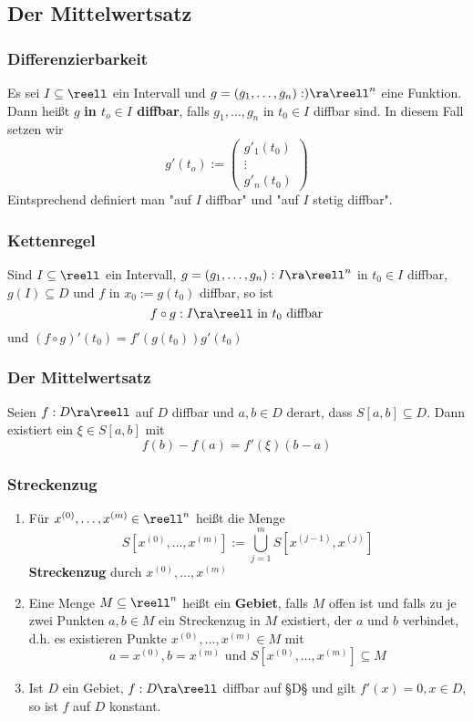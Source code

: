 \documentclass{kit}
\begin{document}
  \subsection{Der Mittelwertsatz}
    \subsubsection{Differenzierbarkeit}
      Es sei $I\subseteq\reell$ ein Intervall und $g=(g_1,\dots,g_n):)\ra\reell^n$ eine Funktion. Dann heißt $g$
      \textbf{in $t_o\in I$ diffbar}, falls $g_1,\dots,g_n$ in $t_0\in I$ diffbar sind. In diesem Fall setzen wir
      $$g'(t_o):=\begin{pmatrix}
        g'_1(t_0)\\
        \vdots\\
        g'_n(t_0)
      \end{pmatrix}$$
      Eintsprechend definiert man "auf $I$ diffbar" und "auf $I$ stetig diffbar".
    \subsubsection{Kettenregel}
      Sind $I\subseteq\reell$ ein Intervall, $g=(g_1,\dots,g_n):I\ra\reell^n$ in $t_0\in I$ diffbar, $g(I)\subseteq D$ und
      $f$ in $x_0:=g(t_0)$ diffbar, so ist
      $$f\circ g:I\ra\reell\text{ in $t_0$ diffbar}$$
      und $(f\circ g)'(t_0)=f'(g(t_0))g'(t_0)$
    \subsubsection{Der Mittelwertsatz}
      Seien $f:D\ra\reell$ auf $D$ diffbar und $a,b\in D$ derart, dass $S[a,b]\subseteq D$. Dann existiert ein 
      $\xi\in S[a,b]$ mit
      $$f(b)-f(a)=f'(\xi)(b-a)$$
    \subsubsection{Streckenzug}
      \begin{enumerate}
        \item Für $x^{(0)},\dots,x^{(m)}\in\reell^n$ heißt die Menge
          $$S\left[x^{(0)},\dots,x^{(m)}\right]:=\bigcup^m_{j=1}S\left[x^{(j-1)},x^{(j)}\right]$$
          \textbf{Streckenzug} durch $x^{(0)},\dots,x^{(m)}$
        \item Eine Menge $M\subseteq\reell^n$ heißt ein \textbf{Gebiet}, falls $M$ offen ist und falls zu je zwei Punkten
          $a,b\in M$ ein Streckenzug in $M$ existiert, der $a$ und $b$ verbindet, d.h. es existieren Punkte $x^{(0)},\dots,
          x^{(m)}\in M$ mit
          $$a=x^{(0)},b=x^{(m)}\text{ und }S\left[x^{(0)},\dots,x^{(m)}\right]\subseteq M$$
        \item Ist $D$ ein Gebiet, $f:D\ra\reell$ diffbar auf §D§ und gilt $f'(x)=0,x\in D$, so ist $f$ auf $D$ konstant.
      \end{enumerate}
\end{document}
